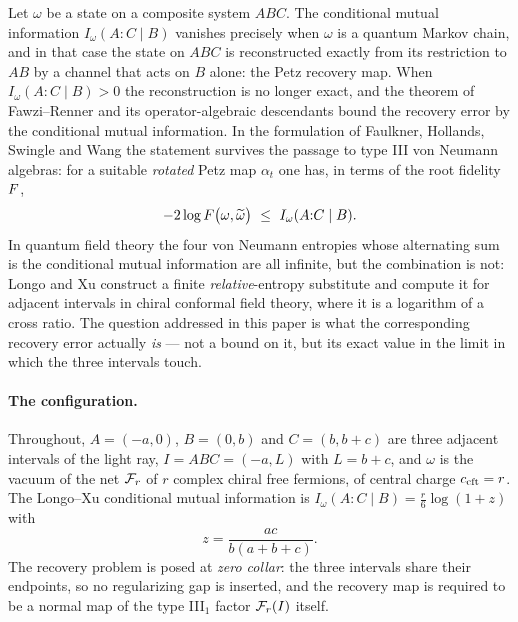 \label{sec:intro}
Let $\omega$ be a state on a composite system $ABC$.  The conditional mutual
information $I_\omega(A{:}C\mid B)$ vanishes precisely when $\omega$ is a quantum
Markov chain, and in that case the state on $ABC$ is reconstructed exactly from
its restriction to $AB$ by a channel that acts on $B$ alone: the Petz recovery
map.  When $I_\omega(A{:}C\mid B)>0$ the reconstruction is no longer exact, and
the theorem of Fawzi--Renner \cite{FR} and its operator-algebraic descendants bound the
recovery error by the conditional mutual information.  In the formulation of
Faulkner, Hollands, Swingle and Wang \cite{FHSW} the statement survives the
passage to type III von Neumann algebras: for a suitable \emph{rotated} Petz map
$\alpha_t$ one has, in terms of the root fidelity $F$,
\begin{equation}\label{eq:fhsw}
 -2\log F\bigl(\omega,\widetilde\omega\bigr)\ \le\ I_\omega(A{:}C\mid B).
\end{equation}
In quantum field theory the four von Neumann entropies whose alternating sum is
the conditional mutual information are all infinite, but the combination is not:
Longo and Xu \cite{LX} construct a finite \emph{relative}-entropy substitute and
compute it for adjacent intervals in chiral conformal field theory, where it is a
logarithm of a cross ratio.  The question addressed in this paper is what the
corresponding recovery error actually \emph{is} --- not a bound on it, but its
exact value in the limit in which the three intervals touch.

\paragraph{The configuration.}
Throughout, $A=(-a,0)$, $B=(0,b)$ and $C=(b,b+c)$ are three adjacent intervals of
the light ray, $I=ABC=(-a,L)$ with $L=b+c$, and $\omega$ is the vacuum of the net
$\mathcal F_r$ of $r$ complex chiral free fermions, of central charge $c_{\rm cft}=r$.
The Longo--Xu conditional mutual information is
$I_\omega(A{:}C\mid B)=\frac r6\log(1+z)$ with
\begin{equation}\label{eq:z-intro}
 z=\frac{ac}{b(a+b+c)}.
\end{equation}
The recovery problem is posed at \emph{zero collar}: the three intervals share
their endpoints, so no regularizing gap is inserted, and the recovery map is
required to be a normal map of the type III$_1$ factor $\mathcal F_r(I)$ itself.

